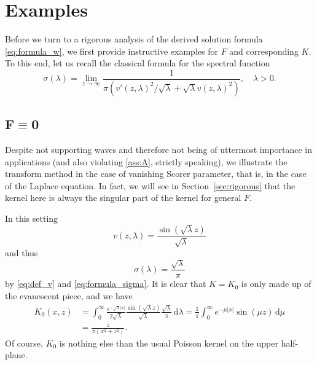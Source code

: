 \documentclass[11pt,twoside,reqno,centertags]{amsart}
\theoremstyle{definition}
\newcommand{\dd}{\mathrm d}
\begin{document}
\section{Examples}\label{sec:examples}
Before we turn to a rigorous analysis of the derived solution formula \eqref{eq:formula_w}, we first provide instructive examples for $F$ and corresponding $K$. To this end, let us recall the classical formula for the spectral function \cite{Titchmarsh46}
\begin{equation}\label{eq:formula_sigma}
	\sigma(\lambda) = \lim_{z\to\infty}\frac{1}{\pi(v'(z,\lambda)^2/\sqrt\lambda+\sqrt\lambda v(z,\lambda)^2)},\quad \lambda>0.
\end{equation}

\subsection{\texorpdfstring{$\mathbf{F\equiv0}$}{F = 0}} 
Despite not supporting waves and therefore not being of uttermost importance in applications (and also violating \eqref{ass:A}, strictly speaking), we illustrate the transform method in the case of vanishing Scorer parameter, that is, in the case of the Laplace equation. In fact, we will see in Section~\ref{sec:rigorous} that the kernel here is always the singular part of the kernel for general $F$.

In this setting
\begin{equation}\label{eq:formula_v_F=0}
	v(z,\lambda) = \frac{\sin(\sqrt\lambda z)}{\sqrt\lambda}
\end{equation}
and thus
\begin{equation}\label{eq:formula_sigma_F=0}
	\sigma(\lambda) = \frac{\sqrt\lambda}{\pi}
\end{equation}
by \eqref{eq:def_v} and \eqref{eq:formula_sigma}. It is clear that $K=K_0$ is only made up of the evanescent piece, and we have
\begin{align}
	K_0(x,z) &= \int_0^\infty \frac{e^{-\sqrt\lambda|x|}}{2\sqrt\lambda}\frac{\sin(\sqrt\lambda z)}{\sqrt\lambda}\frac{\sqrt\lambda}{\pi}\,\dd\lambda = \frac{1}{\pi} \int_0^\infty e^{-\mu|x|}\sin(\mu z)\,\dd \mu \nonumber\\
	&= \frac{z}{\pi(x^2+z^2)}.\label{eq:K0}
\end{align}
Of course, $K_0$ is nothing else than the usual Poisson kernel on the upper half-plane.
\end{document}

